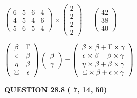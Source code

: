 \documentclass[12pt]{article}
\begin{document}
 
$\left( \begin{array}{ccccccccccccccc}
           6 & 
           5 & 
           6 & 
           4 \\ 
           4 & 
           5 & 
           4 & 
           6 \\ 
           5 & 
           6 & 
           5 & 
           4
\end{array}\right) \times
\left( \begin{array}{c}
           2 \\ 
           2 \\ 
           2 \\ 
           2
\end{array}\right)  =
\left( \begin{array}{c}
          42 \\ 
          38 \\ 
          40
\end{array}\right)  $
 
$  %
 \left( \begin{array}
 {
 c
 c
 }
 \beta & 
 \Gamma \\ 
 \epsilon & 
 \beta \\ 
 \eta & 
 \beta \\ 
                    \Xi & 
 \epsilon
 \end{array} \right)
 \left( \begin{array}
 {
 c
 }
 \beta \\ 
 \gamma
 \end{array} \right)
=
  \left( \begin{array}
 {
 c
 }
 \beta \times  \beta   +  \Gamma \times  \gamma \\ 
 \epsilon \times  \beta   +  \beta \times  \gamma \\ 
 \eta \times  \beta   +  \beta \times  \gamma \\ 
                    \Xi \times  \beta   +  \epsilon \times  \gamma
 \end{array} \right)
$
 
 
 
 
 
\noindent{}

 
 
  
\vspace{0.2in}
  
{\textbf{\Large{QUESTION
28.8 
 (          7,         14,         50)
}}}
  
  
 
\end{document}
